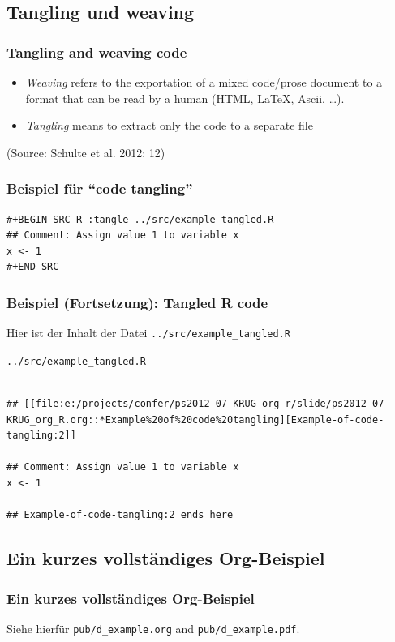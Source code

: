 \documentclass[bigger]{beamer}
\begin{document}
\subsection{Tangling und weaving}
\label{sec-3-2}
\begin{frame}
\frametitle{Tangling and weaving code}
\label{sec-3-2-1}


\begin{itemize}
\item \emph{Weaving} refers to the exportation of a mixed code/prose document to a format
  that can be read by a human (HTML, \LaTeX, Ascii, \ldots{}).
\item \emph{Tangling} means to extract only the code to a separate file
\end{itemize}

(Source: Schulte et al. 2012: 12)
\end{frame}
\begin{frame}[fragile]
\frametitle{Beispiel für \enquote{code tangling}}
\label{sec-3-2-2}



\begin{verbatim}
#+BEGIN_SRC R :tangle ../src/example_tangled.R 
## Comment: Assign value 1 to variable x
x <- 1
#+END_SRC
\end{verbatim}
\end{frame}
\begin{frame}[fragile]
\frametitle{Beispiel (Fortsetzung): Tangled R code}
\label{sec-3-2-3}


Hier ist der Inhalt der Datei \texttt{../src/example\_tangled.R}
\begin{block}{\texttt{../src/example\_tangled.R}}
\label{sec-3-2-3-1}

\begin{footnotesize}

\begin{verbatim}

## [[file:e:/projects/confer/ps2012-07-KRUG_org_r/slide/ps2012-07-KRUG_org_R.org::*Example%20of%20code%20tangling][Example-of-code-tangling:2]]

## Comment: Assign value 1 to variable x
x <- 1

## Example-of-code-tangling:2 ends here
\end{verbatim}
\end{footnotesize}
\end{block}
\end{frame}
\subsection{Ein kurzes vollständiges Org-Beispiel}
\label{sec-3-3}
\begin{frame}
\frametitle{Ein kurzes vollständiges Org-Beispiel}
\label{sec-3-3-1}


Siehe hierfür \texttt{pub/d\_example.org} and \texttt{pub/d\_example.pdf}.
\end{frame}
\end{document}
